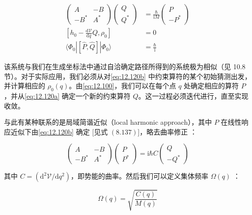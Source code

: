 \begin{align}
\left(\begin{array}{cc}
A & -B\\
-B^{*} & A^{*}
\end{array}\right)\left(\begin{array}{c}
Q\\
Q^{*}
\end{array}\right) & =\frac{\hbar}{\mathrm{i}M}\left(\begin{array}{c}
P\\
-P^{*}
\end{array}\right)\label{eq:12.120a}\\
\left[h_{0}-\frac{\mathrm{d}\mathcal{V}}{\mathrm{d}q}Q,\rho_{0}\right] & =0\label{eq:12.120b}\\
\langle\Phi_{0}|[\hat{P},\hat{Q}]|\Phi_{0}\rangle & =\frac{\hbar}{\mathrm{i}}\label{eq:12.120c}
\end{align}

该系统与我们在生成坐标法中通过自洽确定路径所得到的系统极为相似（见 10.8 节）。对于实际应用，我们必须从对\ref{eq:12.120b}
中约束算符的某个初始猜测出发，并计算相应的 $\rho_{0}(q)$。由\ref{eq:12.100}，我们可以在每个点 $q$
处确定相应的算符 $P$，并从\ref{eq:12.120a} 确定一个新的约束算符 $Q$。这一过程必须迭代进行，直至实现收敛。

与此有某种联系的是局域简谐近似（local harmonic approach）\cite{HY74,RB76,Ma77b,ABC77b,MV77}，其中
$P$ 在线性响应近似下由\ref{eq:12.120b} 确定 {[}见式 $(8.137)${]}，略去曲率修正 \cite{RG77}：

\begin{equation}
\left(\begin{array}{cc}
A & -B\\
-B^{*} & A^{*}
\end{array}\right)\left(\begin{array}{c}
P\\
P^{*}
\end{array}\right)=\mathrm{i}\hbar C\left(\begin{array}{c}
Q\\
-Q^{*}
\end{array}\right)\label{eq:12.121}
\end{equation}

其中 $C=(\mathrm{d}^{2}\mathcal{V}/\mathrm{d}q^{2})$，即势能的曲率。然后我们可以定义集体频率
$\Omega(q)$ \cite{RB76}：

\begin{equation}
\Omega(q)=\sqrt{\frac{C(q)}{M(q)}}\label{eq:12.122}
\end{equation}

